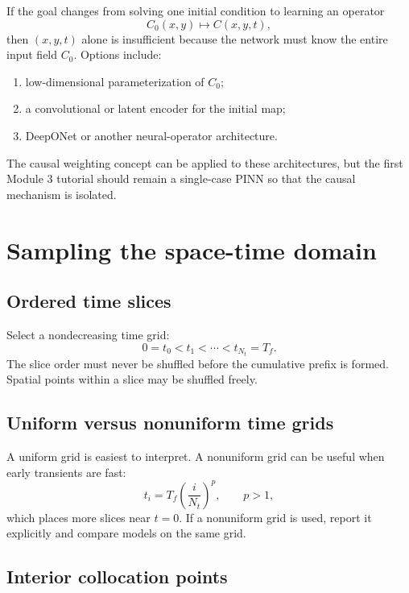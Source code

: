 \documentclass[11pt]{article}
\begin{document}
If the goal changes from solving one initial condition to learning an operator
\begin{equation}
C_0(x,y)
\longmapsto
C(x,y,t),
\end{equation}
then $(x,y,t)$ alone is insufficient because the network must know the entire input field $C_0$. Options include:
\begin{enumerate}[label=\arabic*.]
    \item low-dimensional parameterization of $C_0$;
    \item a convolutional or latent encoder for the initial map;
    \item DeepONet or another neural-operator architecture.
\end{enumerate}
The causal weighting concept can be applied to these architectures, but the first Module 3 tutorial should remain a single-case PINN so that the causal mechanism is isolated.

\section{Sampling the space-time domain}

\subsection{Ordered time slices}

Select a nondecreasing time grid:
\begin{equation}
0=t_0<t_1<\cdots<t_{N_t}=T_f.
\end{equation}
The slice order must never be shuffled before the cumulative prefix is formed. Spatial points within a slice may be shuffled freely.

\subsection{Uniform versus nonuniform time grids}

A uniform grid is easiest to interpret. A nonuniform grid can be useful when early transients are fast:
\begin{equation}
t_i
=
T_f\left(\frac{i}{N_t}\right)^p,
\qquad p>1,
\end{equation}
which places more slices near $t=0$. If a nonuniform grid is used, report it explicitly and compare models on the same grid.

\subsection{Interior collocation points}
\end{document}
